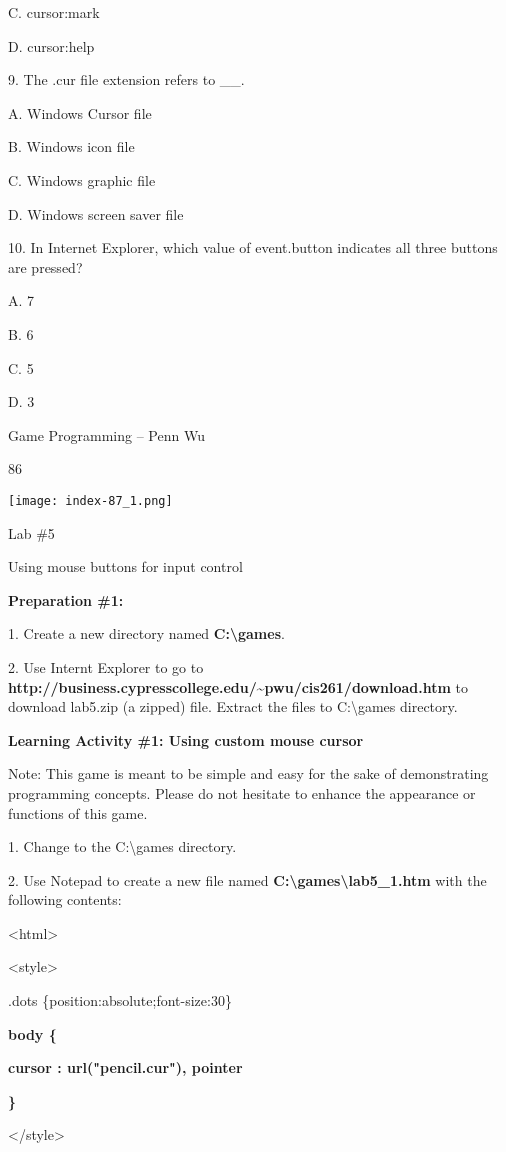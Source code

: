 \documentclass[
]{article}
\begin{document}
C. cursor:mark

D. cursor:help

9. The .cur file extension refers to \_\_.

A. Windows Cursor file

B. Windows icon file

C. Windows graphic file

D. Windows screen saver file

10. In Internet Explorer, which value of event.button indicates all
three buttons are pressed?

A. 7

B. 6

C. 5

D. 3

Game Programming -- Penn Wu

86

\protect\hypertarget{index_split_006.htmlux5cux23p87}{}{}\texttt{[image: index-87\_1.png]}

Lab \#5

Using mouse buttons for input control

\textbf{Preparation \#1:}

1. Create a new directory named \textbf{C:\textbackslash games}.

2. Use Internt Explorer to go to
\textbf{http://business.cypresscollege.edu/\textasciitilde pwu/cis261/download.htm}
to download lab5.zip (a zipped) file. Extract the files to
C:\textbackslash games directory.

\textbf{Learning Activity \#1: Using custom mouse cursor}

Note: This game is meant to be simple and easy for the sake of
demonstrating programming concepts. Please do not hesitate to enhance
the appearance or functions of this game.

1. Change to the C:\textbackslash games directory.

2. Use Notepad to create a new file named
\textbf{C:\textbackslash games\textbackslash lab5\_1.htm} with the
following contents:

\textless html\textgreater{}

\textless style\textgreater{}

.dots \{position:absolute;font-size:30\}

\textbf{body \{}

\textbf{cursor : url("pencil.cur"), pointer}

\textbf{\}}

\textless/style\textgreater{}
\end{document}
